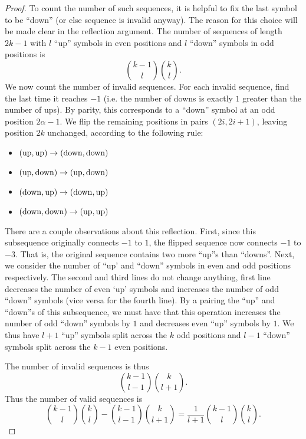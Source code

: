 \documentclass[11pt,openany]{article}
\begin{document}
\begin{proof}
    To count the number of such sequences, it is helpful to fix the last symbol to be ``down'' (or else sequence is invalid anyway). The reason for this choice will be made clear in the reflection argument. The number of sequences of length $2k-1$ with $l$ ``up'' symbols in even positions and $l$ ``down'' symbols in odd positions is \[
    \binom{k-1}{l}\binom{k}{l}.
    \]
    We now count the number of invalid sequences. For each invalid sequence, find the last time it reaches $-1$ (i.e. the number of downs is exactly $1$ greater than the number of ups). By parity, this corresponds to a ``down'' symbol at an odd position $2\alpha-1$. We flip the remaining positions in pairs $(2i,2i+1)$, leaving position $2k$ unchanged, according to the following rule:
    \begin{itemize}
        \item $(\rm{up,up})\to (\rm{down,down})$
        \item $(\rm{up,down})\to (\rm{up,down})$
        \item $(\rm{down,up})\to (\rm{down,up})$
        \item $(\rm{down,down})\to (\rm{up,up})$
    \end{itemize}
    There are a couple observations about this reflection. First, since this subsequence originally connects $-1$ to $1$, the flipped sequence now connects $-1$ to $-3$. That is, the original sequence contains two more ``up''s than ``downs''. Next, we consider the number of ``up' and ``down'' symbols in even and odd positions respectively. The second and third lines do not change anything, first line decreases the number of even `up' symbols and increases the number of odd ``down'' symbols (vice versa for the fourth line). By a pairing the ``up'' and ``down''s of this subsequence, we must have that this operation increases the number of odd ``down'' symbols by $1$ and decreases even ``up'' symbols by $1$. We thus have $l+1$ ``up'' symbols split across the $k$ odd positions and $l-1$ ``down'' symbols split across the $k-1$ even positions. 
    
    The number of invalid sequences is thus \[
        \binom{k-1}{l-1}\binom{k}{l+1}.
    \]
    Thus the number of valid sequences is \[
        \binom{k-1}{l}\binom{k}{l}-\binom{k-1}{l-1}\binom{k}{l+1} = \frac{1}{l+1} \binom{k-1}{l}\binom{k}{l}.
    \]
\end{proof}
\end{document}
